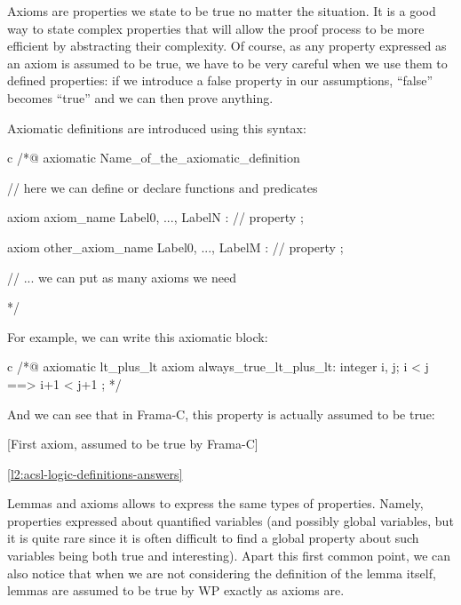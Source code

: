 Axioms are properties we state to be true no matter the situation. It is
a good way to state complex properties that will allow the proof process
to be more efficient by abstracting their complexity. Of course, as any
property expressed as an axiom is assumed to be true, we have to be very
careful when we use them to defined properties: if we introduce a false
property in our assumptions, ``false'' becomes ``true'' and we can then
prove anything.





Axiomatic definitions are introduced using this syntax:



\begin{CodeBlock}{c}
/*@
  axiomatic Name_of_the_axiomatic_definition {
    // here we can define or declare functions and predicates

    axiom axiom_name { Label0, ..., LabelN }:
      // property ;

    axiom other_axiom_name { Label0, ..., LabelM }:
      // property ;

    // ... we can put as many axioms we need
  }
*/
\end{CodeBlock}



For example, we can write this axiomatic block:



\begin{CodeBlock}{c}
/*@
  axiomatic lt_plus_lt{
    axiom always_true_lt_plus_lt:
      \forall integer i, j; i < j ==> i+1 < j+1 ;
  }
*/
\end{CodeBlock}



And we can see that in Frama-C, this property is actually assumed to be
true:



[First axiom, assumed to be true by Frama-C]

\ref{l2:acsl-logic-definitions-answers}





Lemmas and axioms allows to express the same types of properties.
Namely, properties expressed about quantified variables (and possibly
global variables, but it is quite rare since it is often difficult to
find a global property about such variables being both true and
interesting). Apart this first common point, we can also notice that
when we are not considering the definition of the lemma itself, lemmas
are assumed to be true by WP exactly as axioms are.




